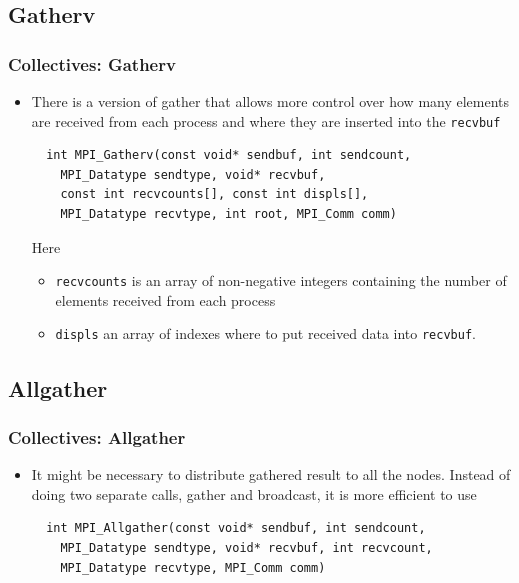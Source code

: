 \documentclass{beamer}
\begin{document}
\subsection{Gatherv}
\begin{frame}[fragile]
  \frametitle{Collectives: Gatherv}
\begin{itemize}
\item There is a version of gather that allows more control over how many elements are received from each process and where they are inserted into the {\color{mycolorcode}\verb|recvbuf|}
{\color{mycolorcode}
\begin{verbatim}
  int MPI_Gatherv(const void* sendbuf, int sendcount, 
    MPI_Datatype sendtype, void* recvbuf, 
    const int recvcounts[], const int displs[],
    MPI_Datatype recvtype, int root, MPI_Comm comm)
\end{verbatim}
}
Here 
\begin{itemize}
\item {\color{mycolorcode}\verb|recvcounts|} is an array of non-negative integers containing the number of elements received from each process
\item {\color{mycolorcode}\verb|displs|} an array of indexes where to put received data into {\color{mycolorcode}\verb|recvbuf|}.
\end{itemize}
\end{itemize}
\end{frame}

\subsection{Allgather}
\begin{frame}[fragile]
  \frametitle{Collectives: Allgather}
\begin{itemize}
\item It might be necessary to distribute gathered result to all the nodes. Instead of doing two separate calls, gather and broadcast, it is more efficient to use
{\color{mycolorcode}
\begin{verbatim}
  int MPI_Allgather(const void* sendbuf, int sendcount,
    MPI_Datatype sendtype, void* recvbuf, int recvcount,
    MPI_Datatype recvtype, MPI_Comm comm)
\end{verbatim}
}
\end{itemize}
\end{frame}
\end{document}
